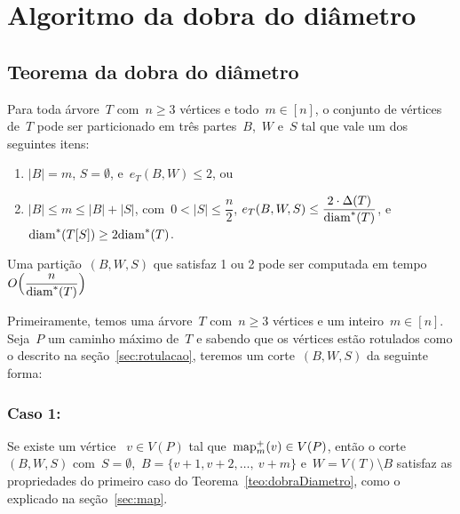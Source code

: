 \section {Algoritmo da dobra do diâmetro}
\label{sec:dobraDiametro}
	\subsection{Teorema da dobra do diâmetro}
	
		\begin{teo}
		\label{teo:dobraDiametro}
			Para toda árvore~$T$ com~$n\ge 3$ vértices e 
			todo~$m\in [n]$,
			o conjunto de vértices de~$T$ pode ser particionado em 
			três partes~$B$,~$W$ e~$S$ tal que vale um dos 
			seguintes itens:
			\begin{enumerate}
				\item ${|B|=m}$, ${S=\emptyset}$, e~${e_T(B,W)\le 2}$, ou
				\item ${|B|\le m\le |B|+|S|}$, 
				com~${0<|S|\le\dfrac{n}{2}}$,
				${e_T(B,W,S)\le \dfrac{2\cdot 
				\Delta(T)}{\mathrm{diam}^*(T)}}$, 
				e~${\mathrm{diam}^*(T[S])\ge 2\mathrm{diam}^*(T)}$.
			\end{enumerate}
			Uma partição~$(B,W,S)$ que satisfaz 1 ou 2 pode ser
			computada em tempo~${O\Big(\dfrac{n}{\mathrm{diam}^*(T)}\Big)}$ 
		\end{teo}

	\bigskip
	\bigskip



		Primeiramente, temos uma árvore~$T$ com~${n\ge 3}$ vértices e um 
		inteiro~${m\in[n]}$.
		Seja~$P$ um caminho máximo de~$T$ e sabendo que os vértices
		estão rotulados como o descrito na seção~\ref{sec:rotulacao},
		teremos um corte~$(B,W,S)$ da seguinte forma:
		\bigskip
		\bigskip
	
	\subsubsection*{Caso 1:}
			Se existe um vértice ~${v\in V(P)}$ tal 
			que~${\mathrm{map}_m^+(v)\in V(P)}$, então o 
			corte~$(B,W,S)$ 
			com~${S=\emptyset}$,~${B =\{v+1, v+2,\ldots,~v+m\}}$
			e~${W=V(T)\setminus B}$ satisfaz as propriedades do
			primeiro caso do Teorema~\ref{teo:dobraDiametro},
			como o explicado na seção~\ref{sec:map}.

